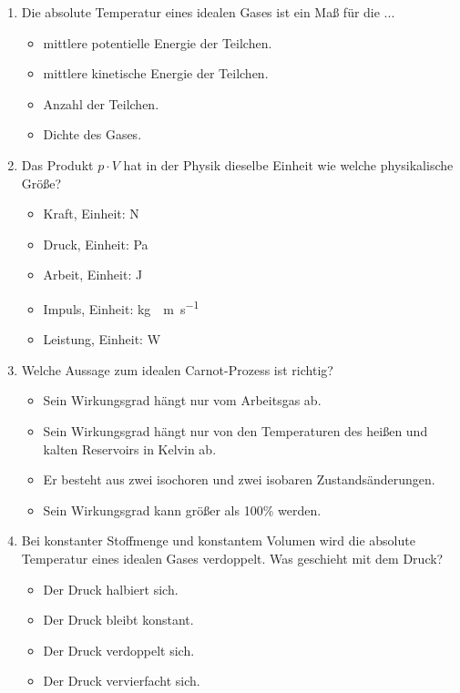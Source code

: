 \documentclass[11pt, a4paper]{article}
\begin{document}
\begin{enumerate}[label=\arabic*.,itemsep=18pt]
    \newpage
    \item Die absolute Temperatur eines idealen Gases ist ein Maß für die ...
    \begin{itemize}[label={$\square$},itemsep=1pt,topsep=0pt]
        \item mittlere potentielle Energie der Teilchen.
        \item mittlere kinetische Energie der Teilchen.
        \item Anzahl der Teilchen.
        \item Dichte des Gases.
    \end{itemize}

    \item Das Produkt $p \cdot V$ hat in der Physik dieselbe Einheit wie welche physikalische Größe?
    \begin{itemize}[label={$\square$},itemsep=1pt,topsep=0pt]
        \item Kraft, Einheit: \si{\newton}
        \item Druck, Einheit: \si{\pascal}
        \item Arbeit, Einheit: \si{\joule}
        \item Impuls, Einheit: \si{\kilogram\cdot \metre\per\second}
        \item Leistung, Einheit: \si{\watt}
    \end{itemize}

    \item Welche Aussage zum idealen Carnot-Prozess ist richtig?
    \begin{itemize}[label={$\square$},itemsep=1pt,topsep=0pt]
        \item Sein Wirkungsgrad hängt nur vom Arbeitsgas ab.
        \item Sein Wirkungsgrad hängt nur von den Temperaturen des heißen und kalten Reservoirs in Kelvin ab.
        \item Er besteht aus zwei isochoren und zwei isobaren Zustandsänderungen.
        \item Sein Wirkungsgrad kann größer als 100\% werden.
    \end{itemize}

    \item Bei konstanter Stoffmenge und konstantem Volumen wird die absolute Temperatur eines idealen Gases verdoppelt. Was geschieht mit dem Druck?
    \begin{itemize}[label={$\square$},itemsep=1pt,topsep=0pt]
        \item Der Druck halbiert sich.
        \item Der Druck bleibt konstant.
        \item Der Druck verdoppelt sich.
        \item Der Druck vervierfacht sich.
    \end{itemize}


\end{enumerate}
\end{document}
